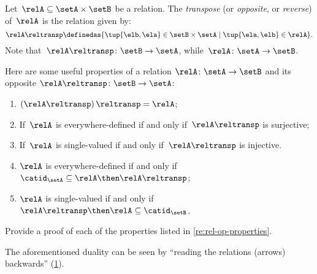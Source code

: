 \begin{definition}
    \label{def:relation-transpose}
    Let~$\relA\subseteq \setA\times \setB$ be a relation. The \emph{transpose} (or \emph{opposite}, or \emph{reverse}) of~$\relA$ is the relation given by:
    \begin{equation*}
        \relA\reltransp \definedas \{\tup{\elb,\ela}\in \setB\times \setA \mid \tup{\ela,\elb}\in \relA \}.
    \end{equation*}
    Note that~$\relA\reltransp\colon \setB\to \setA$, while~$\relA\colon \setA\to \setB$.
\end{definition}
\begin{remark}
    \label{re:rel-op-properties}
    Here are some useful properties of a relation $\relA\colon \setA\to \setB$  and its opposite $\relA\reltransp\colon \setB\to \setA$:  \begin{enumerate}
                                                                                                                                     \item $\left(\relA\reltransp\right)\reltransp = \relA $;
                                                                                                                                     \item If~$\relA$ is everywhere-defined if and only if~$\relA\reltransp$ is surjective;
                                                                                                                                     \item If~$\relA$ is single-valued if and only if~$\relA\reltransp$ is injective.
                                                                                                                                     \item $\relA$ is everywhere-defined if and only if~$\catid_\setA\subseteq \relA \then \relA\reltransp$;
                                                                                                                                     \item $\relA$ is single-valued if and only if~$\relA\reltransp\then \relA\subseteq \catid_\setB$.
    \end{enumerate}
\end{remark}

\begin{gradedexercise}
    \label{ex:RelProperties}
    Provide a proof of each of the properties listed in \cref{re:rel-op-properties}.
\end{gradedexercise}



\begin{remark}
    The aforementioned duality can be seen by ``reading the relations (arrows) backwards'' (\cref{fig:rel_transpose}).
\end{remark}

\begin{figure}[h!]
    \centering
    \caption{}
    \label{fig:rel_transpose}
\end{figure}
